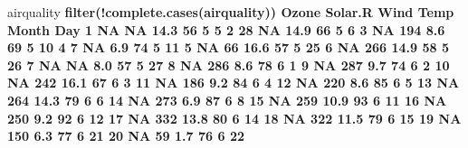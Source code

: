 \documentclass[]{article}
\newenvironment{Shaded}{\begin{snugshade}}{\end{snugshade}}
\newcommand{\DecValTok}[1]{\textcolor[rgb]{0.00,0.00,0.81}{#1}}
\newcommand{\FloatTok}[1]{\textcolor[rgb]{0.00,0.00,0.81}{#1}}
\newcommand{\KeywordTok}[1]{\textcolor[rgb]{0.13,0.29,0.53}{\textbf{#1}}}
\newcommand{\NormalTok}[1]{#1}
\newcommand{\OperatorTok}[1]{\textcolor[rgb]{0.81,0.36,0.00}{\textbf{#1}}}
\newcommand{\OtherTok}[1]{\textcolor[rgb]{0.56,0.35,0.01}{#1}}
\newcommand{\StringTok}[1]{\textcolor[rgb]{0.31,0.60,0.02}{#1}}
\begin{document}
\begin{Shaded}
\begin{Highlighting}[]
\NormalTok{airquality }\OperatorTok{%
\StringTok{  }\KeywordTok{filter}\NormalTok{(}\OperatorTok{!}\KeywordTok{complete.cases}\NormalTok{(airquality))}
\NormalTok{   Ozone Solar.R Wind Temp Month Day}
\DecValTok{1}     \OtherTok{NA}      \OtherTok{NA} \FloatTok{14.3}   \DecValTok{56}     \DecValTok{5}   \DecValTok{5}
\DecValTok{2}     \DecValTok{28}      \OtherTok{NA} \FloatTok{14.9}   \DecValTok{66}     \DecValTok{5}   \DecValTok{6}
\DecValTok{3}     \OtherTok{NA}     \DecValTok{194}  \FloatTok{8.6}   \DecValTok{69}     \DecValTok{5}  \DecValTok{10}
\DecValTok{4}      \DecValTok{7}      \OtherTok{NA}  \FloatTok{6.9}   \DecValTok{74}     \DecValTok{5}  \DecValTok{11}
\DecValTok{5}     \OtherTok{NA}      \DecValTok{66} \FloatTok{16.6}   \DecValTok{57}     \DecValTok{5}  \DecValTok{25}
\DecValTok{6}     \OtherTok{NA}     \DecValTok{266} \FloatTok{14.9}   \DecValTok{58}     \DecValTok{5}  \DecValTok{26}
\DecValTok{7}     \OtherTok{NA}      \OtherTok{NA}  \FloatTok{8.0}   \DecValTok{57}     \DecValTok{5}  \DecValTok{27}
\DecValTok{8}     \OtherTok{NA}     \DecValTok{286}  \FloatTok{8.6}   \DecValTok{78}     \DecValTok{6}   \DecValTok{1}
\DecValTok{9}     \OtherTok{NA}     \DecValTok{287}  \FloatTok{9.7}   \DecValTok{74}     \DecValTok{6}   \DecValTok{2}
\DecValTok{10}    \OtherTok{NA}     \DecValTok{242} \FloatTok{16.1}   \DecValTok{67}     \DecValTok{6}   \DecValTok{3}
\DecValTok{11}    \OtherTok{NA}     \DecValTok{186}  \FloatTok{9.2}   \DecValTok{84}     \DecValTok{6}   \DecValTok{4}
\DecValTok{12}    \OtherTok{NA}     \DecValTok{220}  \FloatTok{8.6}   \DecValTok{85}     \DecValTok{6}   \DecValTok{5}
\DecValTok{13}    \OtherTok{NA}     \DecValTok{264} \FloatTok{14.3}   \DecValTok{79}     \DecValTok{6}   \DecValTok{6}
\DecValTok{14}    \OtherTok{NA}     \DecValTok{273}  \FloatTok{6.9}   \DecValTok{87}     \DecValTok{6}   \DecValTok{8}
\DecValTok{15}    \OtherTok{NA}     \DecValTok{259} \FloatTok{10.9}   \DecValTok{93}     \DecValTok{6}  \DecValTok{11}
\DecValTok{16}    \OtherTok{NA}     \DecValTok{250}  \FloatTok{9.2}   \DecValTok{92}     \DecValTok{6}  \DecValTok{12}
\DecValTok{17}    \OtherTok{NA}     \DecValTok{332} \FloatTok{13.8}   \DecValTok{80}     \DecValTok{6}  \DecValTok{14}
\DecValTok{18}    \OtherTok{NA}     \DecValTok{322} \FloatTok{11.5}   \DecValTok{79}     \DecValTok{6}  \DecValTok{15}
\DecValTok{19}    \OtherTok{NA}     \DecValTok{150}  \FloatTok{6.3}   \DecValTok{77}     \DecValTok{6}  \DecValTok{21}
\DecValTok{20}    \OtherTok{NA}      \DecValTok{59}  \FloatTok{1.7}   \DecValTok{76}     \DecValTok{6}  \DecValTok{22}
}
\end{Highlighting}
\end{Shaded}
\end{document}
